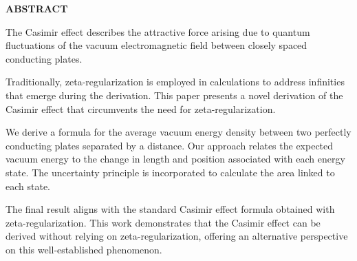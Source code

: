 \noindent\textbf{ABSTRACT}

The Casimir effect describes the attractive force arising due to quantum fluctuations of the vacuum electromagnetic field 
between closely spaced conducting plates. 

Traditionally, zeta-regularization is employed in calculations to address infinities that emerge during the derivation. 
This paper presents a novel derivation of the Casimir effect that circumvents the need for zeta-regularization.

We derive a formula for the average vacuum energy density between two perfectly conducting plates separated by a distance. 
Our approach relates the expected vacuum energy to the change in length and position associated with each energy state. 
The uncertainty principle is incorporated to calculate the area linked to each state. 

The final result aligns with the standard Casimir effect formula obtained with zeta-regularization. 
This work demonstrates that the Casimir effect can be derived without relying on zeta-regularization, 
offering an alternative perspective on this well-established phenomenon.

